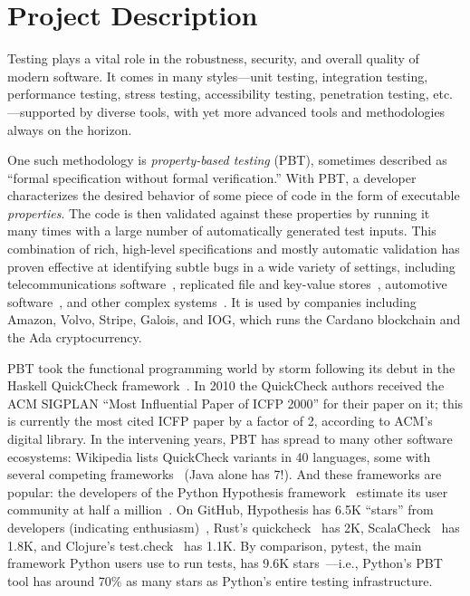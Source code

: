 \section*{Project Description}

Testing plays a vital role in the robustness, security, and overall
quality of modern software. It comes in many styles---unit testing,
integration testing, performance testing, stress testing,
accessibility testing, penetration testing, etc.---supported by
diverse tools, with yet more advanced tools and methodologies always on
the horizon.

One such methodology is {\em property-based testing} (PBT),
sometimes described as ``formal specification without formal
verification.''  With PBT, a developer characterizes the desired
behavior of
some piece of code in the form of executable {\em
  properties}. The code is
then validated against these properties by running it many times
with a large number of automatically generated test
inputs.
%
%
This combination of rich, high-level specifications and mostly
automatic validation has proven effective at identifying
subtle bugs in a wide variety of settings, including
telecommunications software~\cite{arts2006testing}, replicated
file and key-value
stores~\cite{MysteriesOfDropbox2016,Bornholt2021}, automotive
software~\cite{arts2015testing}, and other complex
systems~\cite{hughes_experiences_2016}.
It is used by companies including Amazon, Volvo, Stripe, Galois,
and IOG, which
runs the Cardano blockchain and the Ada cryptocurrency.

PBT took the functional programming world by storm following its
debut in the Haskell QuickCheck framework~\cite{ClaessenHughes00}.  In
2010 the
QuickCheck authors received the ACM SIGPLAN ``Most Influential Paper of ICFP
2000'' for their paper on it; this is currently the most cited
ICFP paper by
a factor of 2, according to ACM's digital library.  In the intervening
years, PBT has spread to many other software ecosystems:
%
Wikipedia lists QuickCheck variants in 40  languages, some
with several competing frameworks~\cite{QuickCheckWikipedia} (Java alone has
7!).
%
And these frameworks are popular:
the developers of the Python Hypothesis framework~\cite{maciver2019hypothesis,HypothesisGithub} estimate its user community
at half a million~\cite{ZacPersonalCommunication,noauthor_python_nodate}.  On GitHub,
Hypothesis has 6.5K ``stars'' from developers (indicating enthusiasm)~\cite{borges_whats_2018}, Rust's
quickcheck~\cite{RustQuickcheckGithub} has 2K,
ScalaCheck~\cite{ScalaCheckGithub} has 1.8K, and Clojure's
test.check~\cite{ClojureTest.checkGithub} has 1.1K.
By comparison, pytest, the main framework Python users use to run
tests, has 9.6K stars~\cite{PytestGitHub}---i.e., Python's
PBT tool has around 70\% as many stars as Python's entire testing
infrastructure.

